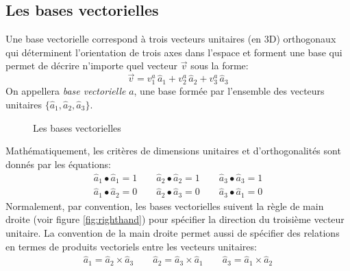 \subsection{Les bases vectorielles}
\label{vectorbasis}
Une base vectorielle correspond à trois vecteurs unitaires (en 3D) orthogonaux qui déterminent l'orientation de trois axes dans l'espace et forment une base qui permet de décrire n'importe quel vecteur $\vec{v}$ sous la forme:
\begin{equation}
\vec{v} = v_1^a \, \hat{a}_{1} + v_2^a \, \hat{a}_{2} + v_3^a \, \hat{a}_{3}
\label{eq:vecbasis}
\end{equation} 
On appellera \textit{base vectorielle} $a$, une base formée par l'ensemble des vecteurs unitaires $\{\hat{a}_{1},\hat{a}_{2},\hat{a}_{3}\}$.
%
\begin{figure}[htpb]
        \centering
				\hspace{10pt}
				\hspace{10pt}
        \caption{Les bases vectorielles}
				\label{fig:vecbasis}
\end{figure}

Mathématiquement, les critères de dimensions unitaires et d'orthogonalités sont donnés par les équations:
\begin{align}
\hat{a}_{1} \bullet \hat{a}_{1} = 1 \quad\quad \hat{a}_{2} \bullet \hat{a}_{2} = 1 \quad\quad \hat{a}_{3} \bullet \hat{a}_{3} = 1 
\label{eq:unit} \\
\hat{a}_{1} \bullet \hat{a}_{2} = 0 \quad\quad \hat{a}_{2} \bullet \hat{a}_{3} = 0 \quad\quad \hat{a}_{3} \bullet \hat{a}_{1} = 0
\label{eq:ortho}
\end{align} 
Normalement, par convention, les bases vectorielles suivent la règle de main droite (voir figure \ref{fig:righthand}) pour spécifier la direction du troisième vecteur unitaire. La convention de la main droite permet aussi de spécifier des relations en termes de produits vectoriels entre les vecteurs unitaires:
\begin{align}
\hat{a}_{1} = \hat{a}_{2} \times \hat{a}_{3} \quad\quad \hat{a}_{2} = \hat{a}_{3} \times \hat{a}_{1} \quad\quad \hat{a}_{3} = \hat{a}_{1} \times \hat{a}_{2} 
\label{eq:righthand}
\end{align} 

